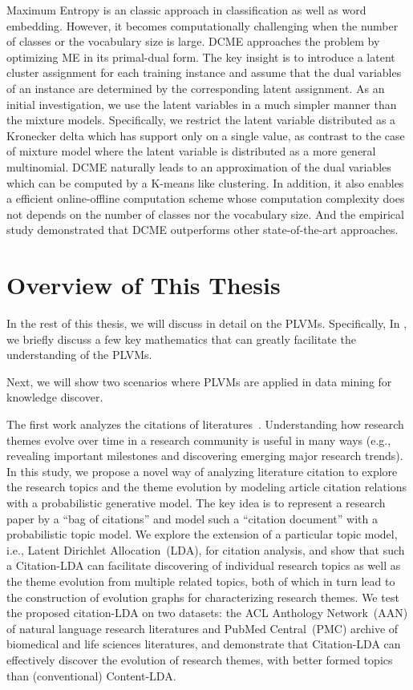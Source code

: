 Maximum Entropy is an classic approach in classification as well as word
embedding. However, it becomes computationally challenging when the number of
classes or the vocabulary size is large. DCME approaches the problem by
optimizing ME in its primal-dual form. The key insight is to introduce a latent
cluster assignment for each training instance and assume that the dual variables
of an instance are determined by the corresponding latent assignment. As an
initial investigation, we use the latent variables in a much simpler manner than
the mixture models. Specifically, we restrict the latent variable distributed as
a Kronecker delta which has support only on a single value, as contrast to the
case of mixture model where the latent variable is distributed as a more general
multinomial. DCME naturally leads to an approximation of the dual variables
which can be computed by a K-means like clustering. In addition, it also enables
a efficient online-offline computation scheme whose computation complexity does
not depends on the number of classes nor the vocabulary size. And the empirical
study demonstrated that DCME outperforms other state-of-the-art approaches.

\section{Overview of This Thesis}

In the rest of this thesis, we will discuss in detail on the PLVMs.
Specifically,  In , we briefly discuss a few key
mathematics that can greatly facilitate the understanding of the PLVMs.

Next, we will show two scenarios where PLVMs are applied in data mining for
knowledge discover.

The first work analyzes the citations of
literatures~\cite{wang2013understanding}. Understanding how research themes
evolve over time in a research community is useful in many ways (e.g., revealing
important milestones and discovering emerging major research trends).  In this
study, we propose a novel way of analyzing literature citation to explore the
research topics and the theme evolution by modeling article citation relations
with a probabilistic generative model.  The key idea is to represent a research
paper by a ``bag of citations'' and model such a ``citation document'' with a
probabilistic topic model.  We explore the extension of a particular topic
model, i.e., Latent Dirichlet Allocation~(LDA), for citation analysis, and show
that such a Citation-LDA can facilitate discovering of individual research
topics as well as the theme evolution from multiple related topics, both of
which in turn lead to the construction of evolution graphs for characterizing
research themes.  We test the proposed citation-LDA on two datasets: the ACL
Anthology Network~(AAN) of natural language research literatures and PubMed
Central~(PMC) archive of biomedical and life sciences literatures, and
demonstrate that Citation-LDA can effectively discover the evolution of research
themes, with better formed topics than (conventional) Content-LDA.

